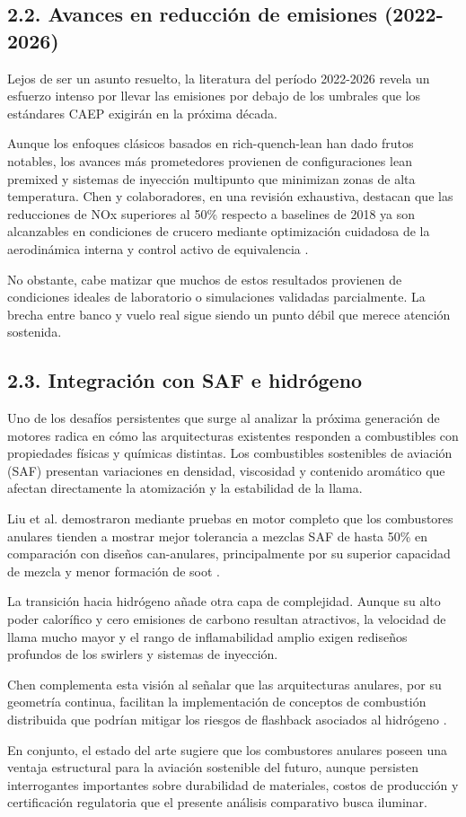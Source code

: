\subsection{2.2. Avances en reducción de emisiones (2022-2026)}

Lejos de ser un asunto resuelto, la literatura del período 2022-2026 revela un esfuerzo intenso por llevar las emisiones por debajo de los umbrales que los estándares CAEP exigirán en la próxima década. 

Aunque los enfoques clásicos basados en rich-quench-lean han dado frutos notables, los avances más prometedores provienen de configuraciones lean premixed y sistemas de inyección multipunto que minimizan zonas de alta temperatura. Chen y colaboradores, en una revisión exhaustiva, destacan que las reducciones de NOx superiores al 50\% respecto a baselines de 2018 ya son alcanzables en condiciones de crucero mediante optimización cuidadosa de la aerodinámica interna y control activo de equivalencia \cite{Chen2025}. 

No obstante, cabe matizar que muchos de estos resultados provienen de condiciones ideales de laboratorio o simulaciones validadas parcialmente. La brecha entre banco y vuelo real sigue siendo un punto débil que merece atención sostenida.

\subsection{2.3. Integración con SAF e hidrógeno}

Uno de los desafíos persistentes que surge al analizar la próxima generación de motores radica en cómo las arquitecturas existentes responden a combustibles con propiedades físicas y químicas distintas. Los combustibles sostenibles de aviación (SAF) presentan variaciones en densidad, viscosidad y contenido aromático que afectan directamente la atomización y la estabilidad de la llama.

Liu et al. demostraron mediante pruebas en motor completo que los combustores anulares tienden a mostrar mejor tolerancia a mezclas SAF de hasta 50\% en comparación con diseños can-anulares, principalmente por su superior capacidad de mezcla y menor formación de soot \cite{Liu2024}. 

La transición hacia hidrógeno añade otra capa de complejidad. Aunque su alto poder calorífico y cero emisiones de carbono resultan atractivos, la velocidad de llama mucho mayor y el rango de inflamabilidad amplio exigen rediseños profundos de los swirlers y sistemas de inyección. 

Chen complementa esta visión al señalar que las arquitecturas anulares, por su geometría continua, facilitan la implementación de conceptos de combustión distribuida que podrían mitigar los riesgos de flashback asociados al hidrógeno \cite{Chen2025}. 

En conjunto, el estado del arte sugiere que los combustores anulares poseen una ventaja estructural para la aviación sostenible del futuro, aunque persisten interrogantes importantes sobre durabilidad de materiales, costos de producción y certificación regulatoria que el presente análisis comparativo busca iluminar.